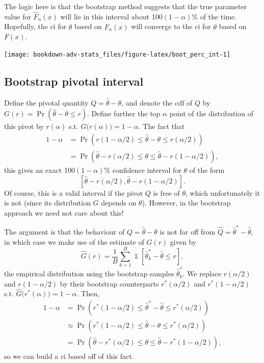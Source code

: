 \documentclass[
]{book}
\DeclareMathOperator{\ind}{\mathds{1}}
\theoremstyle{definition}
\theoremstyle{definition}
\theoremstyle{definition}
\theoremstyle{definition}
\theoremstyle{remark}
\begin{document}
The logic here is that the bootstrap method suggests that the true parameter value for \(\hat F_n(x)\) will lie in this interval about 100\((1-\alpha)\)\% of the time.
Hopefully, the ci for \(\theta\) based on \(\hat F_n(x)\) will converge to the ci for \(\theta\) based on \(F(x)\).

\begin{center}\texttt{[image: bookdown-adv-stats\_files/figure-latex/boot\_perc\_int-1]} \end{center}

\hypertarget{bootstrap-pivotal-interval}{%
\subsection{Bootstrap pivotal interval}\label{bootstrap-pivotal-interval}}

Define the pivotal quantity \(Q=\hat\theta - \theta\), and denote the cdf of \(Q\) by \(G(r) = \Pr(\hat\theta - \theta \leq r)\). Define further the top \(\alpha\) point of the distribution of this pivot by \(r(\alpha)\) s.t. \(G\big(r(\alpha)\big)=1-\alpha\).
The fact that
\begin{align*}
1-\alpha &= \Pr\left(r(1-\alpha/2) \leq \hat\theta - \theta \leq r(\alpha/2) \right) \\
&= \Pr\left(\hat\theta - r(\alpha/2) \leq \theta \leq \hat\theta - r(1-\alpha/2) \right),
\end{align*}
this gives an exact 100\((1-\alpha)\)\% confidence interval for \(\theta\) of the form
\[
\left[ \hat\theta - r(\alpha/2), \hat\theta - r(1-\alpha/2) \right].
\]
Of course, this is a valid interval if the pivot \(Q\) is free of \(\theta\), which unfortunately it is not (since its distribution \(G\) depends on \(\theta\)). However, in the bootstrap approach we need not care about this!

The argument is that the behaviour of \(Q=\hat\theta - \theta\) is not far off from \(\hat Q = \hat\theta^* - \hat\theta\), in which case we make use of the estimate of \(G(r)\) given by
\[
\hat G(r) = \frac{1}{B} \sum_{k=1}^B \ind[\hat\theta^*_k - \hat\theta \leq r],
\]
the empirical distribution using the bootstrap samples \(\hat\theta^*_k\). We replace \(r(\alpha/2)\) and \(r(1-\alpha/2)\) by their bootstrap counterparts \(r^*(\alpha/2)\) and \(r^*(1-\alpha/2)\) s.t. \(\hat G\big(r^*(\alpha)\big)=1-\alpha\). Then,
\begin{align*}
1-\alpha 
&= \Pr\left(r^*(1-\alpha/2) \leq \hat\theta^* - \hat\theta \leq r^*(\alpha/2) \right) \\
&\approx \Pr\left(r^*(1-\alpha/2) \leq \hat\theta - \theta \leq r^*(\alpha/2) \right) \\
&= \Pr\left(\hat\theta - r^*(\alpha/2) \leq \theta \leq \hat\theta - r^*(1-\alpha/2) \right),
\end{align*}
so we can build a ci based off of this fact.
\end{document}
